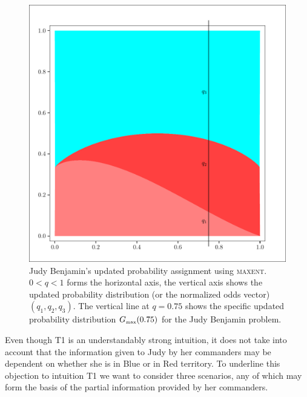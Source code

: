 \documentclass[12pt]{article}
\begin{document}
\begin{figure}[h]
  \begin{flushright}
    \begin{minipage}[h]{\lwv\linewidth}
      \includegraphics[width=\textwidth]{zeroone-mxnt.pdf}
      \caption{Judy Benjamin's updated probability assignment using
        \textsc{maxent}. $0<q<1$ forms the horizontal axis, the
        vertical axis shows the updated probability distribution (or
        the normalized odds vector) $(q_{1},q_{2},q_{3})$. The
        vertical line at $q=0.75$ shows the specific updated
        probability distribution $G_{\mbox{\tiny max}}(0.75)$ for the Judy
        Benjamin problem.}
      \label{fig:mxnt}
    \end{minipage}
  \end{flushright}
\end{figure}

\medskip


\smallskip

\nias Even though T1 is an understandably strong intuition, it does
not take into account that the information given to Judy by her
commanders may be dependent on whether she is in Blue or in Red
territory. To underline this objection to intuition T1 we want to
consider three scenarios, any of which may form the basis of the
partial information provided by her commanders.
\end{document}
